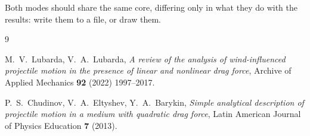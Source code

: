 \documentclass[11pt]{article}
\begin{document}
Both modes should share the same core, differing only in what they do
with the results: write them to a file, or draw them.

\begin{thebibliography}{9}

M.~V.~Lubarda, V.~A.~Lubarda,
\emph{A review of the analysis of wind-influenced projectile motion in the presence of linear and nonlinear drag force},
Archive of Applied Mechanics \textbf{92} (2022) 1997--2017.

P.~S.~Chudinov, V.~A.~Eltyshev, Y.~A.~Barykin,
\emph{Simple analytical description of projectile motion in a medium with quadratic drag force},
Latin American Journal of Physics Education \textbf{7} (2013).

\end{thebibliography}
\end{document}
